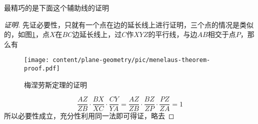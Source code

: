 最精巧的是下面这个辅助线的证明
\begin{proof}[证明]
  先证必要性，只就有一个点在边的延长线上进行证明，三个点的情况是类似的，如图\ref{fig:menelaus-theorem-proof}，点$X$在$BC$边延长线上，过$C$作$XYZ$的平行线，与边$AB$相交于点$P$，那么有
 
  \begin{figure}[htbp]
  \centering
\texttt{[image: content/plane-geometry/pic/menelaus-theorem-proof.pdf]}
\caption{梅涅劳斯定理的证明}
\label{fig:menelaus-theorem-proof}
\end{figure}

  \begin{equation*}
    \frac{AZ}{ZB} \cdot \frac{BX}{XC} \cdot \frac{CY}{YA} =
    \frac{AZ}{ZB} \cdot \frac{BZ}{ZP} \cdot \frac{PZ}{ZA} = 1
  \end{equation*}
所以必要性成立，充分性利用同一法即可得证，略去
\end{proof}

